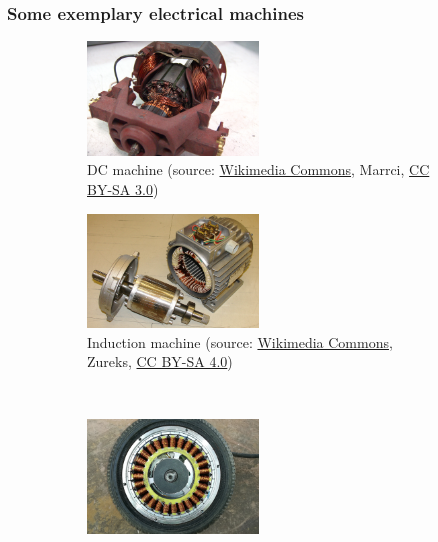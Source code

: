 \begin{frame}
	\frametitle{Some exemplary electrical machines}
	\begin{figure}
		\centering
		\begin{subfigure}[b]{0.49\textwidth}
			\centering
			\includegraphics[width=0.5\textwidth]{fig/lec01/Universalmotor.JPG}
			\caption{DC machine (source: \href{https://commons.wikimedia.org/wiki/File:Universalmotor_3.JPG}{Wikimedia Commons}, Marrci, \href{https://creativecommons.org/licenses/by-sa/3.0/deed.en}{CC BY-SA 3.0})}
		\end{subfigure}
		\hfill
		\begin{subfigure}[b]{0.49\textwidth}
			\centering
			\includegraphics[width=0.5\textwidth]{fig/lec01/Induction_motor_stator_rotor.JPG}
			\caption{Induction machine (source: \href{https://commons.wikimedia.org/wiki/File:Stator_and_rotor_by_Zureks.JPG}{Wikimedia Commons}, Zureks, \href{https://creativecommons.org/licenses/by-sa/4.0/deed.en}{CC BY-SA 4.0})}
		\end{subfigure}
		\\
		\begin{subfigure}[b]{0.49\textwidth}
			\centering
			\includegraphics[width=0.5\textwidth]{fig/lec01/Wheel_hub_PMSM.jpg}

\end{subfigure}
\end{figure}
\end{frame}
